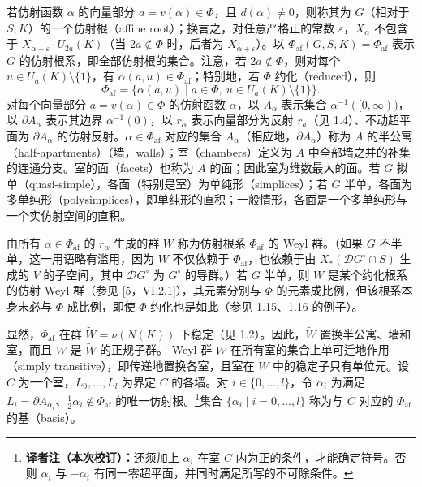 若仿射函数 $\alpha$ 的向量部分 $a=v(\alpha)\in\Phi$，且 $d(\alpha)\ne0$，则称其为 $G$（相对于 $S,K$）的一个仿射根（affine root）；换言之，对任意严格正的常数 $\varepsilon$，$X_\alpha$ 不包含于 $X_{\alpha+\varepsilon}\cdot U_{2a}(K)$（当 $2a\notin\Phi$ 时，后者为 $X_{\alpha+\varepsilon}$）。以 $\Phi_{\mathrm{af}}(G,S,K)=\Phi_{\mathrm{af}}$ 表示 $G$ 的仿射根系，即全部仿射根的集合。注意，若 $2a\notin\Phi$，则对每个 $u\in U_a(K)\setminus\{1\}$，有 $\alpha(a,u)\in\Phi_{\mathrm{af}}$；特别地，若 $\Phi$ 约化（reduced），则
\[
\Phi_{\mathrm{af}}=\{\alpha(a,u)\mid a\in\Phi,\ u\in U_a(K)\setminus\{1\}\}.
\]
对每个向量部分 $a=v(\alpha)\in\Phi$ 的仿射函数 $\alpha$，以 $A_\alpha$ 表示集合 $\alpha^{-1}([0,\infty))$，以 $\partial A_\alpha$ 表示其边界 $\alpha^{-1}(0)$，以 $r_\alpha$ 表示向量部分为反射 $r_a$（见 1.4）、不动超平面为 $\partial A_\alpha$ 的仿射反射。$\alpha\in\Phi_{\mathrm{af}}$ 对应的集合 $A_\alpha$（相应地，$\partial A_\alpha$）称为 $A$ 的半公寓（half-apartments）（墙，walls）；室（chambers）定义为 $A$ 中全部墙之并的补集的连通分支。室的面（facets）也称为 $A$ 的面；因此室为维数最大的面。若 $G$ 拟单（quasi-simple），各面（特别是室）为单纯形（simplices）；若 $G$ 半单，各面为多单纯形（polysimplices），即单纯形的直积；一般情形，各面是一个多单纯形与一个实仿射空间的直积。

由所有 $\alpha\in\Phi_{\mathrm{af}}$ 的 $r_\alpha$ 生成的群 $W$ 称为仿射根系 $\Phi_{\mathrm{af}}$ 的 Weyl 群。（如果 $G$ 不半单，这一用语略有滥用，因为 $W$ 不仅依赖于 $\Phi_{\mathrm{af}}$，也依赖于由 $X_*(\mathscr DG^\circ\cap S)$ 生成的 $V$ 的子空间，其中 $\mathscr DG^\circ$ 为 $G^\circ$ 的导群。）若 $G$ 半单，则 $W$ 是某个约化根系的仿射 Weyl 群（参见 [5，VI.2.1]），其元素分别与 $\Phi$ 的元素成比例，但该根系本身未必与 $\Phi$ 成比例，即使 $\Phi$ 约化也是如此（参见 1.15、1.16 的例子）。

显然，$\Phi_{\mathrm{af}}$ 在群 $\widetilde W=\nu(N(K))$ 下稳定（见 1.2）。因此，$\widetilde W$ 置换半公寓、墙和室，而且 $W$ 是 $\widetilde W$ 的正规子群。
Weyl 群 $W$ 在所有室的集合上单可迁地作用（simply transitive），即传递地置换各室，且室在 $W$ 中的稳定子只有单位元。设 $C$ 为一个室，$L_0,\ldots,L_l$ 为界定 $C$ 的各墙。对 $i\in\{0,\ldots,l\}$，令 $\alpha_i$ 为满足 $L_i=\partial A_{\alpha_i}$、$\frac12\alpha_i\notin\Phi_{\mathrm{af}}$ 的唯一仿射根。\footnote{\textbf{译者注（本次校订）：}还须加上 $\alpha_i$ 在室 $C$ 内为正的条件，才能确定符号。否则 $\alpha_i$ 与 $-\alpha_i$ 有同一零超平面，并同时满足所写的不可除条件。}集合 $\{\alpha_i\mid i=0,\ldots,l\}$ 称为与 $C$ 对应的 $\Phi_{\mathrm{af}}$ 的基（basis）。

